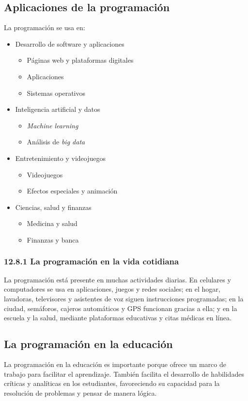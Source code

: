 \documentclass[12pt,letterpaper]{article}
\begin{document}
\subsection{Aplicaciones de la programación}
La programación se usa en:
\begin{itemize}[leftmargin=1.27cm,itemsep=0pt]
  \item Desarrollo de software y aplicaciones
    \begin{itemize}[itemsep=0pt]
      \item Páginas web y plataformas digitales
      \item Aplicaciones
      \item Sistemas operativos
    \end{itemize}
  \item Inteligencia artificial y datos
    \begin{itemize}[itemsep=0pt]
      \item \textit{Machine learning}
      \item Análisis de \textit{big data}
    \end{itemize}
  \item Entretenimiento y videojuegos
    \begin{itemize}[itemsep=0pt]
      \item Videojuegos
      \item Efectos especiales y animación
    \end{itemize}
  \item Ciencias, salud y finanzas
    \begin{itemize}[itemsep=0pt]
      \item Medicina y salud
      \item Finanzas y banca
    \end{itemize}
\end{itemize}

\subsubsection*{12.8.1 La programación en la vida cotidiana}
La programación está presente en muchas actividades diarias. En celulares y computadores se usa en aplicaciones, juegos y redes sociales; en el hogar, lavadoras, televisores y asistentes de voz siguen instrucciones programadas; en la ciudad, semáforos, cajeros automáticos y GPS funcionan gracias a ella; y en la escuela y la salud, mediante plataformas educativas y citas médicas en línea.

\subsection{La programación en la educación}
La programación en la educación es importante porque ofrece un marco de trabajo para facilitar el aprendizaje. También facilita el desarrollo de habilidades críticas y analíticas en los estudiantes, favoreciendo su capacidad para la resolución de problemas y pensar de manera lógica.
\end{document}
